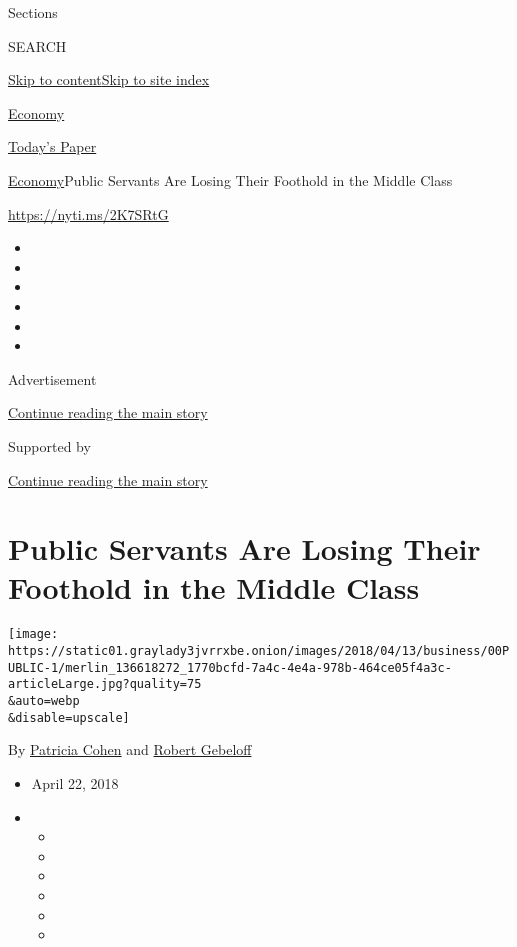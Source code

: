 Sections

SEARCH

\protect\hyperlink{site-content}{Skip to
content}\protect\hyperlink{site-index}{Skip to site index}

\href{https://www.nytimes3xbfgragh.onion/section/business/economy}{Economy}

\href{https://myaccount.nytimes3xbfgragh.onion/auth/login?response_type=cookie\&client_id=vi}{}

\href{https://www.nytimes3xbfgragh.onion/section/todayspaper}{Today's
Paper}

\href{/section/business/economy}{Economy}\textbar{}Public Servants Are
Losing Their Foothold in the Middle Class

\url{https://nyti.ms/2K7SRtG}

\begin{itemize}
\item
\item
\item
\item
\item
\item
\end{itemize}

Advertisement

\protect\hyperlink{after-top}{Continue reading the main story}

Supported by

\protect\hyperlink{after-sponsor}{Continue reading the main story}

\hypertarget{public-servants-are-losing-their-foothold-in-the-middle-class}{%
\section{Public Servants Are Losing Their Foothold in the Middle
Class}\label{public-servants-are-losing-their-foothold-in-the-middle-class}}

\texttt{[image: https://static01.graylady3jvrrxbe.onion/images/2018/04/13/business/00PUBLIC-1/merlin\_136618272\_1770bcfd-7a4c-4e4a-978b-464ce05f4a3c-articleLarge.jpg?quality=75\\\&auto=webp\\\&disable=upscale]}

By \href{http://www.nytimes3xbfgragh.onion/by/patricia-cohen}{Patricia
Cohen} and
\href{http://www.nytimes3xbfgragh.onion/by/robert-gebeloff}{Robert
Gebeloff}

\begin{itemize}
\item
  April 22, 2018
\item
  \begin{itemize}
  \item
  \item
  \item
  \item
  \item
  \item
  \end{itemize}
\end{itemize}

